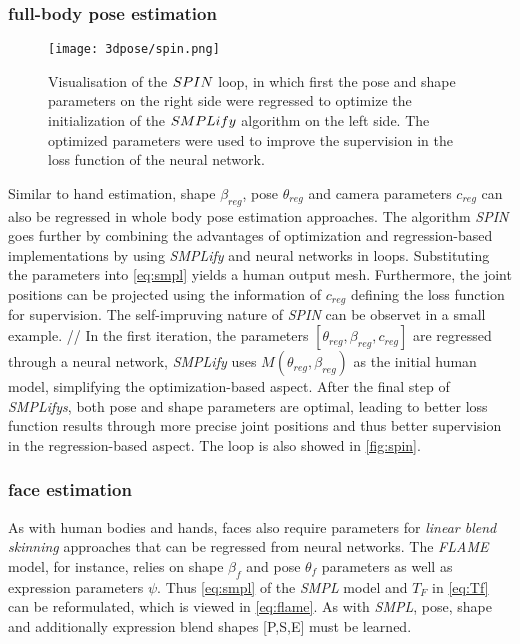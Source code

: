 \subsubsection{full-body pose estimation}
\begin{figure}[h]
	\centering
	\texttt{[image: 3dpose/spin.png]}
	\caption{Visualisation of the $\protect SPIN$ loop, in which first the pose and shape parameters on the right side were regressed to optimize the initialization of the $\protect SMPLify$ algorithm on the left side. The optimized parameters were used to improve the supervision in the loss function of the neural network. \cite{spin}}
	\label{fig:spin}
\end{figure}

Similar to hand estimation, shape $\beta_{reg}$, pose $\theta_{reg}$ and camera parameters $c_{reg}$ can also be regressed in whole body pose estimation approaches. The algorithm \emph{SPIN} goes further by combining the advantages of optimization and regression-based implementations by using \emph{SMPLify} and neural networks in loops. Substituting the parameters into \autoref{eq:smpl} yields a human output mesh. Furthermore, the joint positions can be projected using the information of $c_{reg}$ defining the loss function for supervision. The self-impruving nature of \emph{SPIN} can be observet in a small example. //
In the first iteration, the parameters $[\theta_{reg},\beta_{reg},c_{reg}]$ are regressed through a neural network, \emph{SMPLify} uses $M(\theta_{reg},\beta_{reg})$ as the initial human model, simplifying the optimization-based aspect. After the final step of \emph{SMPLifys}, both pose and shape parameters are optimal, leading to better loss function results through more precise joint positions and thus better supervision in the regression-based aspect. The loop is also showed in \autoref{fig:spin}. \cite{spin}

\subsubsection{face estimation}
As with human bodies and hands, faces also require parameters for \emph{linear blend skinning} approaches that can be regressed from neural networks. The \emph{FLAME} model, for instance, relies on shape $\beta_{f}$ and pose $\theta_{f}$ parameters as well as expression parameters  $\psi$. Thus \autoref{eq:smpl} of the \emph{SMPL} model and $T_{F}$ in \autoref{eq:Tf} can be reformulated, which is viewed in \autoref{eq:flame}. As with \emph{SMPL}, pose, shape and additionally expression blend shapes [P,S,E] must be learned. \cite{flame}

